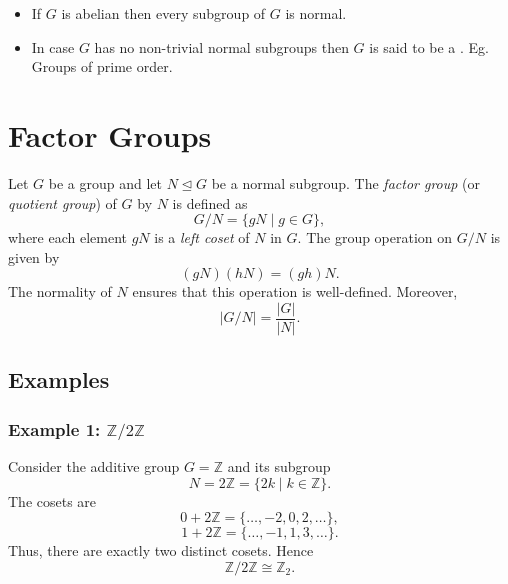 \documentclass[a4paper,12pt]{article}
\theoremstyle{definition}
\begin{document}
\begin{myquote}
    \begin{itemize}
        \item If $G$ is abelian then every subgroup of $G$ is normal.
        \item In case $G$ has no non-trivial normal subgroups then $G$ is said to be a . Eg. Groups of prime order.
    \end{itemize}    
\end{myquote}

\section{Factor Groups}

Let $G$ be a group and let $N \trianglelefteq G$ be a normal subgroup. 
The \emph{factor group} (or \emph{quotient group}) of $G$ by $N$ is defined as
\begin{equation*}
G/N = \{ gN \mid g \in G \},
\end{equation*}
where each element $gN$ is a \emph{left coset} of $N$ in $G$. The group operation on $G/N$ is given by
\begin{equation*}
(gN)(hN) = (gh)N.
\end{equation*}
The normality of $N$ ensures that this operation is well-defined. Moreover,
\begin{equation*}
|G/N| = \frac{|G|}{|N|}.
\end{equation*}

\subsection{Examples}

\subsubsection*{Example 1: \texorpdfstring{$\mathbb{Z}/2\mathbb{Z}$}{Z/2Z}}

Consider the additive group $G=\mathbb{Z}$ and its subgroup
\begin{equation*}
N = 2\mathbb{Z} = \{ 2k \mid k \in \mathbb{Z} \}.
\end{equation*}
The cosets are
\begin{equation*}
0 + 2\mathbb{Z} = \{ \dots,-2,0,2,\dots \},
\end{equation*}
\begin{equation*}
1 + 2\mathbb{Z} = \{ \dots,-1,1,3,\dots \}.
\end{equation*}
Thus, there are exactly two distinct cosets. Hence
\begin{equation*}
\mathbb{Z}/2\mathbb{Z} \cong \mathbb{Z}_2.
\end{equation*}
\end{document}
